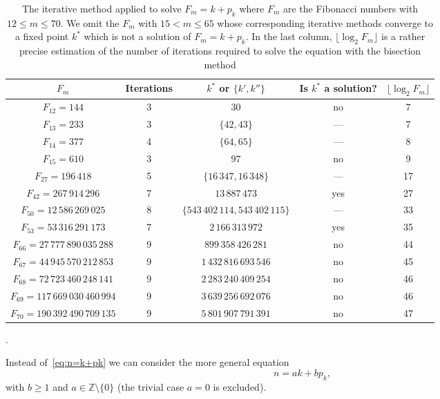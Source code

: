 \documentclass[12pt,reqno]{article}
\begin{document}
\begin{table}
\centering
\begin{tabular}{c@{}c@{}c@{}cc}
\hline
$F_m$ & Iterations & $k^{*}$ or $\{k',k''\}$ 
& Is $k^{*}$ a solution? & $\lfloor\log_2{F_{m}}\rfloor$
\\
\hline
$F_{12} = 144$ & 3 & $30$ & no & 7
\\
$F_{13} = 233$ & 3 & $\{42, 43\}$ & --- & 7
\\
$F_{14} = 377$ & 4 & $\{64, 65\}$ & --- & 8
\\
$F_{15} = 610$ & 3 & $97$ & no & 9
\\
$F_{27} = 196\,418$ & 5 & $\{16\,347, 16\,348\}$ & --- & 17
\\
$F_{42} = 267\,914\,296$ & 7 & $13\,887\,473$ & yes & 27
\\
$F_{50} = 12\,586\,269\,025$ & 8 & $\{543\,402\,114, 543\,402\,115\}$ & --- & 33
\\
$F_{53} = 53\,316\,291\,173$ & 7 & $2\,166\,313\,972$ & yes & 35
\\
$F_{66} = 27\,777\,890\,035\,288$ & 9 & $899\,358\,426\,281$ & no & 44
\\
$F_{67} = 44\,945\,570\,212\,853$ & 9 & $1\,432\,816\,693\,546$ & no & 45
\\
$F_{68} = 72\,723\,460\,248\,141$ & 9 & $2\,283\,240\,409\,254$ & no & 46
\\
$F_{69} = 117\,669\,030\,460\,994$ & 9 & $3\,639\,256\,692\,076$ & no & 46
\\
$F_{70} = 190\,392\,490\,709\,135$ & 9 & $5\,801\,907\,791\,391$ & no & 47
\\
\hline
\end{tabular}%
\caption{The iterative method applied to solve $F_m = k + p_k$ where $F_m$ are the Fibonacci numbers with $12 \le m \le 70$.
We omit the $F_{m}$ with $15 < m \le 65$ whose corresponding iterative methods converge to a fixed point $k^{*}$ which is not a solution of $F_m = k + p_k$. In the last column, $\lfloor\log_2{F_{m}}\rfloor$ is a rather precise estimation of the number of iterations required to solve the equation with the bisection method}.
\label{tab:Fib}
\end{table}

Instead of~\eqref{eq:n=k+pk} we can consider the more general equation
\begin{equation*}
  n = ak + bp_k,
\end{equation*}
with $b \ge 1$ and $a \in \mathbb{Z} \setminus \{0\}$
(the trivial case $a=0$ is excluded).
\end{document}
